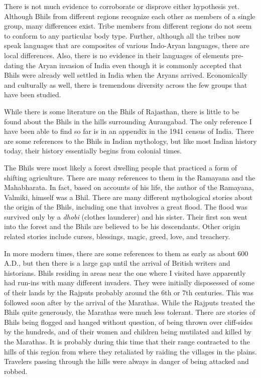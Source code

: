 \documentclass[report.tex]{subfiles}
\begin{document}
There is not much evidence to corroborate or disprove either hypothesis yet. Although Bhils from different regions recognize each other as members of a single group, many differences exist. Tribe members from different regions do not seem to conform to any particular body type. Further, although all the tribes now speak languages that are composites of various Indo-Aryan languages, there are local differences. Also, there is no evidence in their languages of elements pre-dating the Aryan invasion of India even though it is commonly accepted that Bhils were already well settled in India when the Aryans arrived. Economically and culturally as well, there is tremendous diversity across the few groups that have been studied.

While there is some literature on the Bhils of Rajasthan, there is little to be found about the Bhils in the hills surrounding Aurangabad. The only reference I have been able to find so far is in an appendix in the 1941 census of India. There are some references to the Bhils in Indian mythology, but like most Indian history today, their history essentially begins from colonial times.

The Bhils were most likely a forest dwelling people that practiced a form of shifting agriculture. There are many references to them in the Ramayana and the Mahabharata. In fact, based on accounts of his life, the author of the Ramayana, Valmiki, himself was a Bhil. There are many different mythological stories about the origin of the Bhils, including one that involves a great flood. The flood was survived only by a \textit{dhobi} (clothes launderer) and his sister. Their first son went into the forest and the Bhils are believed to be his descendants. Other origin related stories include curses, blessings, magic, greed, love, and treachery.

In more modern times, there are some references to them as early as about 600 A.D., but then there is a large gap until the arrival of British writers and historians. Bhils residing in areas near the one where I visited have apparently had run-ins with many different invaders. They were initially disposessed of some of their lands by the Rajputs probably around the 6th or 7th centuries. This was followed soon after by the arrival of the Marathas. While the Rajputs treated the Bhils quite generously, the Marathas were much less tolerant. There are stories of Bhils being flogged and hanged without question, of being thrown over cliff-sides by the hundreds, and of their women and children being mutilated and killed by the Marathas. It is probably during this time that their range contracted to the hills of this region from where they retaliated by raiding the villages in the plains. Travelers passing through the hills were always in danger of being attacked and robbed.
\end{document}
